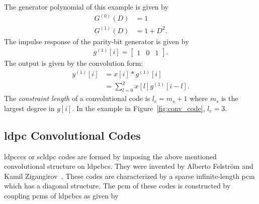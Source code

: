 The generator polynomial of this example is given by
\begin{align}
G^{(0)}(D)&=1\\
G^{(1)}(D)&=1+D^2.
\end{align}
The impulse response of the parity-bit generator is given by
\begin{align}g^{(1)}[i]=\begin{bmatrix}
1 &0 &1
\end{bmatrix}.\end{align}
The output is given by the convolution form:
\begin{align}
y^{(1)}[i]&=x[i]*g^{(1)}[i]\\
&=\sum_{l=0}^{2}x[l]g^{(1)}[i-l]\label{eq:conv_conv}.
\end{align}
The \emph{constraint length} of a convolutional code is $l_c=m_s+1$ where $m_s$ is the largest degree in $g[i]$. In the example in Figure~\ref{fig:conv_code}, $l_c=3$.

\subsection{\texorpdfstring{\acrlong{ldpc}}{LDPC} Convolutional Codes}
\glspl{ldpccc} or \gls{scldpc} codes are formed by imposing the above mentioned convolutional structure on \glspl{ldpcbc}. They were invented by Alberto Felstr{\"o}m and Kamil Zigangirov~\cite{Felstrom1999}. These codes are characterized by a sparse infinite-length \gls{pcm} which has a diagonal structure. The \gls{pcm} of these codes is constructed by coupling \glspl{pcm} of \glspl{ldpcbc} as given by

